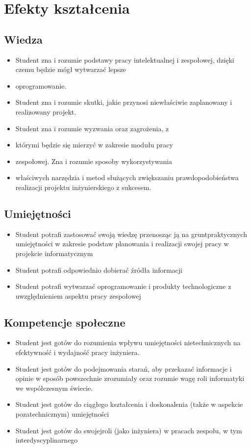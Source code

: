 \documentclass[12pt, a4paper]{article}
\begin{document}
\section{Efekty kształcenia}

\subsection*{Wiedza}
\begin{itemize}
  \item Student zna i rozumie podstawy pracy intelektualnej i zespołowej, dzięki czemu będzie mógł wytwarzać lepsze
  \item oprogramowanie.
  \item Student zna i rozumie skutki, jakie przynosi niewłaściwie zaplanowany i realizowany projekt.
  \item Student zna i rozumie wyzwania oraz zagrożenia, z
  \item którymi będzie się mierzyć w zakresie modułu pracy
  \item zespołowej. Zna i rozumie sposoby wykorzystywania
  \item właściwych narzędzia i metod służących zwiększaniu prawdopodobieństwa realizacji projektu inżynierskiego z sukcesem.
\end{itemize}

\subsection*{Umiejętności}
\begin{itemize}
  \item Student potrafi zastosować swoją wiedzę przenosząc ją na gruntpraktycznych umiejętności w zakresie podstaw planowania i realizacji swojej pracy w projekcie informatycznym
  \item Student potrafi odpowiednio dobierać źródła informacji
  \item Student potrafi wytwarzać oprogramowanie i produkty technologiczne z uwzględnieniem aspektu pracy zespołowej
\end{itemize}

\subsection*{Kompetencje społeczne}
\begin{itemize}
  \item Student jest gotów do rozumienia wpływu umiejętności nietechnicznych na efektywność i wydajność pracy inżyniera.
  \item Student jest gotów do   podejmowania starań, aby przekazać informacje i opinie w sposób powszechnie zrozumiały oraz rozumie  wagę roli informatyki we współczesnym świecie.
  \item Student jest gotów do ciągłego kształcenia i doskonalenia (także w aspekcie pozatechnicznym) umiejętności
  \item Student jest gotów do swojejroli (jako inżyniera) w pracach zespołu, w tym interdyscyplinarnego
\end{itemize}
\end{document}
